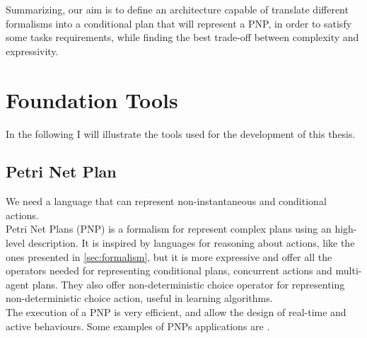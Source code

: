 \documentclass[pdftex,12pt,a4paper]{report}
\begin{document}
\noindent Summarizing, our aim is to define an architecture capable of translate different formalisms into a conditional plan that will represent a PNP, in order to satisfy some tasks requirements, while finding the best trade-off between complexity and expressivity. \\

\chapter{Foundation Tools}\label{sec:foundation}
In the following I will illustrate the tools used for the development of this thesis.

\section{Petri Net Plan}\label{petrinet}
We need a language that can represent non-instantaneous and conditional actions. \\
Petri Net Plans (PNP)\cite{ziparo2006petri}%
\cite{ziparo2008pnp}%
is a formalism for represent complex plans using an high-level description.
It is inspired by languages for reasoning about actions, like the ones presented in \ref{sec:formalism}, but it is more expressive and offer all the operators needed for representing conditional plans, concurrent actions and multi-agent plans.
They also offer non-deterministic choice operator for representing non-deterministic choice action, useful in learning algorithms. \\
The execution of a PNP is very efficient, and allow the design of real-time and active behaviours.
Some examples of PNPs applications are \cite{bastianelli2013line}\cite{palamara2008robotic}\cite{farinelli2006assignment}.
\end{document}
